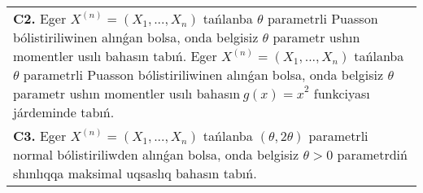 \documentclass{article}
\begin{document}
\begin{tabular}{m{17cm}}
 \\
\textbf{C2.} 
Eger \(X^{(n)} = \left( X_{1},...,X_{n} \right)\) tańlanba \(\theta\) parametrli Puasson bólistiriliwinen alınǵan bolsa, onda belgisiz \(\theta\) parametr ushın momentler usılı bahasın tabıń. Eger \(X^{(n)} = \left( X_{1},...,X_{n} \right)\) tańlanba \(\theta\) parametrli Puasson bólistiriliwinen alınǵan bolsa, onda belgisiz \(\theta\) parametr ushın momentler usılı bahasın\({\ g(x) = x}^{2}\) funkciyası járdeminde tabıń.
 \\
\textbf{C3.} 
Eger \(X^{(n)} = \left( X_{1},...,X_{n} \right)\) tańlanba \((\theta,2\theta)\) parametrli normal bólistiriliwden alınǵan bolsa, onda belgisiz \(\theta > 0\) parametrdiń shınlıqqa maksimal uqsaslıq bahasın tabıń.
 \\

\end{tabular}
\vspace{1cm}
\end{document}
